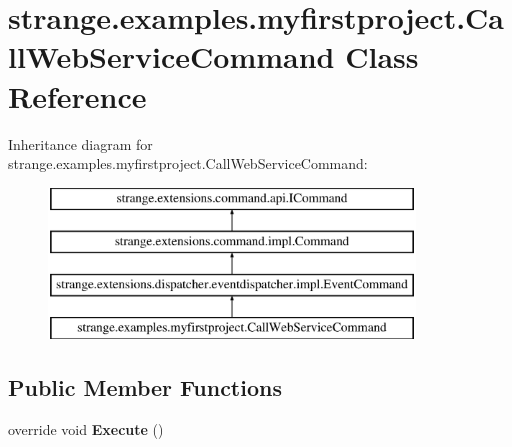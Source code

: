 \hypertarget{classstrange_1_1examples_1_1myfirstproject_1_1_call_web_service_command}{\section{strange.\-examples.\-myfirstproject.\-Call\-Web\-Service\-Command Class Reference}
\label{classstrange_1_1examples_1_1myfirstproject_1_1_call_web_service_command}
}
Inheritance diagram for strange.\-examples.\-myfirstproject.\-Call\-Web\-Service\-Command\-:\begin{figure}[H]
\begin{center}
\leavevmode
\includegraphics[height=4.000000cm]{classstrange_1_1examples_1_1myfirstproject_1_1_call_web_service_command}
\end{center}
\end{figure}
\subsection*{Public Member Functions}
\begin{DoxyCompactItemize}
\item 
\hypertarget{classstrange_1_1examples_1_1myfirstproject_1_1_call_web_service_command_abaf2a17229023d0a9e40887c66e70f1d}{override void {\bfseries Execute} ()}\label{classstrange_1_1examples_1_1myfirstproject_1_1_call_web_service_command_abaf2a17229023d0a9e40887c66e70f1d}

\end{DoxyCompactItemize}
